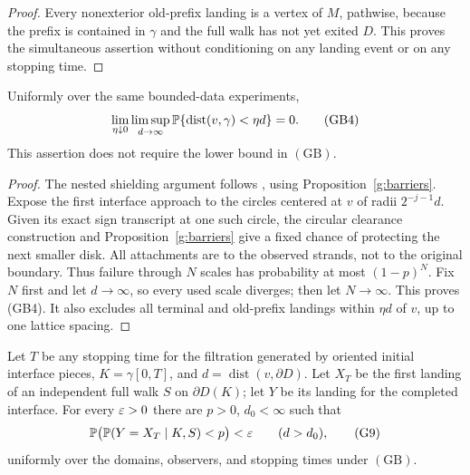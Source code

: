 \begin{proof}
Every nonexterior old-prefix landing is a vertex of \(M\), pathwise,
because the prefix is contained in \(\gamma\) and the full walk has
not yet exited \(D\). This proves the simultaneous assertion without
conditioning on any landing event or on any stopping time.
\end{proof}

\begin{lemma}\label{g:observer-landing}
Uniformly over the same bounded-data experiments,
\[
 \lim_{\eta\downarrow0}\limsup_{d\to\infty}
 \mathbb P\{\operatorname{dist}(v,\gamma)<\eta d\}=0.     \tag{GB4}
\]
This assertion does not require the lower bound in \((\mathrm{GB})\).
\end{lemma}

\begin{proof}
The nested shielding argument follows \cite[Lemma~3.24]{SSdiscrete},
using Proposition~\ref{g:barriers}. Expose the first interface approach
to the circles centered at \(v\)
of radii \(2^{-j-1}d\). Given its exact sign transcript at one such
circle, the circular clearance construction and
Proposition~\ref{g:barriers} give a fixed chance of protecting the
next smaller disk. All attachments are to the observed strands,
not to the original boundary. Thus failure through \(N\) scales
has probability at most \((1-p)^N\). Fix \(N\) first and let
\(d\to\infty\), so every used scale diverges; then let \(N\to\infty\).
This proves (GB4). It also excludes all terminal and old-prefix
landings within \(\eta d\) of \(v\), up to one lattice spacing.
\end{proof}

\begin{lemma}\label{g:survival}
Let \(T\) be any stopping time for the filtration generated by oriented
initial interface pieces, \(K=\gamma[0,T]\), and
\(d=\operatorname{dist}(v,\partial D)\). Let \(X_T\) be the first
landing of an independent full walk \(S\) on \(\partial D(K)\);
let \(Y\) be its landing for the completed interface. For every
\(\varepsilon>0\) there are \(p>0\), \(d_0<\infty\) such that
\[
 \mathbb P\bigl(\mathbb P(Y=X_T\mid K,S)<p\bigr)<\varepsilon
 \qquad(d>d_0),                                      \tag{G9}
\]
uniformly over the domains, observers, and stopping times under
\((\mathrm{GB})\).
\end{lemma}

